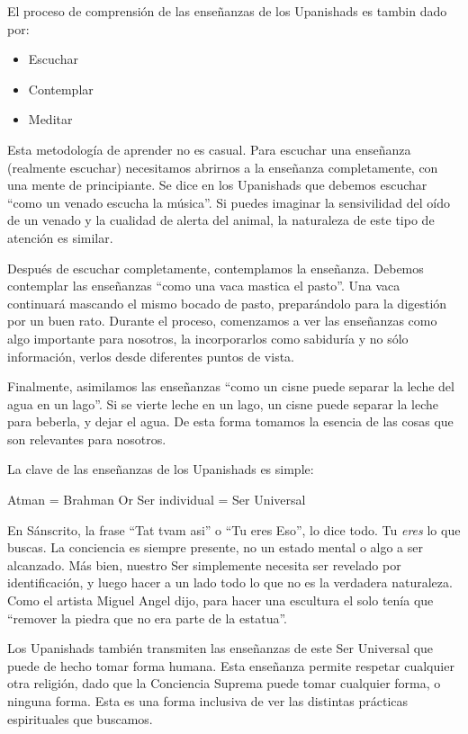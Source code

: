 El proceso de comprensión de las enseñanzas de los Upanishads es tambin dado por:
\begin{itemize}
	\item Escuchar
	\item Contemplar
	\item Meditar
\end{itemize}

Esta metodología de aprender no es casual. Para escuchar una enseñanza (realmente escuchar) necesitamos abrirnos a la enseñanza completamente, con una mente de principiante. Se dice en los Upanishads que debemos escuchar ``como un venado escucha la música''. Si puedes imaginar la sensivilidad del oído de un venado y la cualidad de alerta del animal, la naturaleza de este tipo de atención es similar.

Despu\'es de escuchar completamente, contemplamos la enseñanza. Debemos contemplar las enseñanzas ``como una vaca mastica el pasto''. Una vaca continuará mascando el mismo bocado de pasto, preparándolo para la digestión por un buen rato. Durante el proceso, comenzamos a ver las enseñanzas como algo importante para nosotros, la incorporarlos como sabiduría y no sólo información, verlos desde diferentes puntos de vista.

Finalmente, asimilamos las enseñanzas ``como un cisne puede separar la leche del agua en un lago''. Si se vierte leche en un lago, un cisne puede separar la leche para beberla, y dejar el agua. De esta forma tomamos la esencia de las cosas que son relevantes para nosotros.

La clave de las enseñanzas de los Upanishads es simple:
\begin{center}
	Atman = Brahman
	Or
	Ser individual = Ser Universal
\end{center}

En Sánscrito, la frase ``Tat tvam asi'' o ``Tu eres Eso'', lo dice todo. Tu \textit{eres} lo que buscas. La conciencia es siempre presente, no un estado mental o algo a ser alcanzado. Más bien, nuestro Ser simplemente necesita ser revelado por identificación, y luego hacer a un lado todo lo que no es la verdadera naturaleza. Como el artista Miguel Angel dijo, para hacer una escultura el solo tenía que ``remover la piedra que no era parte de la estatua''.

Los Upanishads tambi\'en transmiten las enseñanzas de este Ser Universal que puede de hecho tomar forma humana. Esta enseñanza permite respetar cualquier otra religión, dado que la Conciencia Suprema puede tomar cualquier forma, o ninguna forma. Esta es una forma inclusiva de ver las distintas prácticas espirituales que buscamos.

